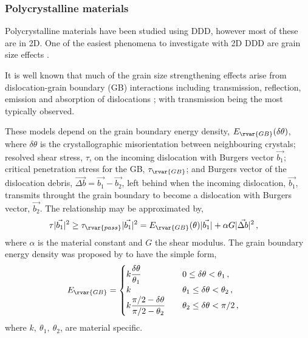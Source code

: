 \subsubsection{Polycrystalline materials}
\label{ss:polycrystal}

Polycrystalline materials have been studied using DDD, however most of these are in 2D. One of the easiest phenomena to investigate with 2D DDD are grain size effects \cite{2d_pcm, 2d_pcm2}.

It is well known that much of the grain size strengthening effects arise from dislocation-grain boundary (GB) interactions including transmission, reflection, emission and absorption of dislocations \cite{grain_size_eff1, grain_size_eff2}; with transmission being the most typically observed.

These models depend on the grain boundary energy density, $ E_{\rvar{GB}}(\delta\theta) $, where $ \delta\theta $ is the crystallographic misorientation between neighbouring crystals; resolved shear stress, $ \tau $, on the incoming dislocation with Burgers vector $ \vec{b_{1}} $; critical penetration stress for the GB, $ \tau_{\rvar{GB}} $; and Burgers vector of the dislocation debris, $ \vec{\Delta b} = \vec{b_{1}} - \vec{b_{2}} $, left behind when the incoming dislocation, $ \vec{b_{1}} $, transmits throught the grain boundary to become a dislocation with Burgers vector, $ \vec{b_{2}} $. The relationship may be approximated by,
\begin{align}\label{eq:dln_trns}
    \tau \lvert\vec{b_{1}}\rvert^{2} & \geq \tau_{\rvar{pass}} \lvert\vec{b_{1}}\rvert^{2} = E_{\rvar{GB}}(\theta) \lvert\vec{b_{1}}\rvert + \alpha G \lvert\vec{\Delta b}\rvert^{2}\,,
\end{align}
where $ \alpha $ is the material constant and $ G $ the shear modulus. The grain boundary energy density was proposed by \citet{gb_e_dens} to have the simple form,
\begin{align}
    E_{\rvar{GB}} & = 	\begin{cases}
        k \dfrac{\delta\theta}{\theta_{1}}                 & \quad 0 \leq \delta\theta < \theta_{1}\,,          \\
        k                                                  & \quad \theta_{1} \leq \delta\theta < \theta_{2}\,, \\
        k \dfrac{\pi/2 - \delta\theta}{\pi/2 - \theta_{2}} & \quad \theta_{2} \leq \delta\theta < \pi/2\,,
    \end{cases}
\end{align}
where $ k,~ \theta_{1},~\theta_{2} $, are material specific.

